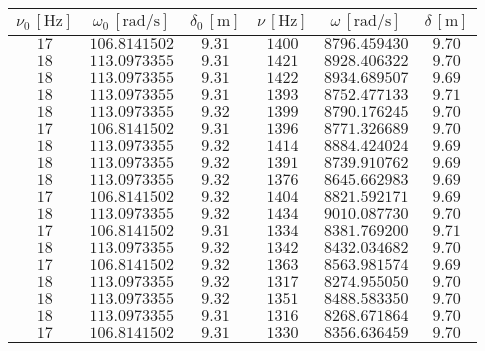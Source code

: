 \documentclass{article} %
\begin{document}
    \begin{table}
        \centering
        \begin{tabular}{||c|c|c||c|c|c||}
            \hline
            $\nu_0 \, [\text{Hz}]$ & $\omega_0 \, [\text{rad/s}]$ &  $\delta_0 \,[\text{m}]$ &  $\nu \,[\text{Hz}]$ & $\omega \,[\text{rad/s}]$ & $\delta \, [\text{m}]$ \\
            \hline\hline
            $17$ & $106.8141502$ & $9.31$ & $1400$ & $8796.459430$ & $9.70$ \\\hline
            $18$ & $113.0973355$ & $9.31$ & $1421$ & $8928.406322$ & $9.70$ \\\hline
            $18$ & $113.0973355$ & $9.31$ & $1422$ & $8934.689507$ & $9.69$ \\\hline
            $18$ & $113.0973355$ & $9.31$ & $1393$ & $8752.477133$ & $9.71$ \\\hline
            $18$ & $113.0973355$ & $9.32$ & $1399$ & $8790.176245$ & $9.70$ \\\hline
            $17$ & $106.8141502$ & $9.31$ & $1396$ & $8771.326689$ & $9.70$ \\\hline
            $18$ & $113.0973355$ & $9.32$ & $1414$ & $8884.424024$ & $9.69$ \\\hline
            $18$ & $113.0973355$ & $9.32$ & $1391$ & $8739.910762$ & $9.69$ \\\hline
            $18$ & $113.0973355$ & $9.32$ & $1376$ & $8645.662983$ & $9.69$ \\\hline
            $17$ & $106.8141502$ & $9.32$ & $1404$ & $8821.592171$ & $9.69$ \\\hline
            $18$ & $113.0973355$ & $9.32$ & $1434$ & $9010.087730$ & $9.70$ \\\hline
            $17$ & $106.8141502$ & $9.31$ & $1334$ & $8381.769200$ & $9.71$ \\\hline
            $18$ & $113.0973355$ & $9.32$ & $1342$ & $8432.034682$ & $9.70$ \\\hline
            $17$ & $106.8141502$ & $9.32$ & $1363$ & $8563.981574$ & $9.69$ \\\hline
            $18$ & $113.0973355$ & $9.32$ & $1317$ & $8274.955050$ & $9.70$ \\\hline
            $18$ & $113.0973355$ & $9.32$ & $1351$ & $8488.583350$ & $9.70$ \\\hline
            $18$ & $113.0973355$ & $9.31$ & $1316$ & $8268.671864$ & $9.70$ \\\hline
            $17$ & $106.8141502$ & $9.31$ & $1330$ & $8356.636459$ & $9.70$ \\\hline

\end{tabular}
\end{table}
\end{document}
